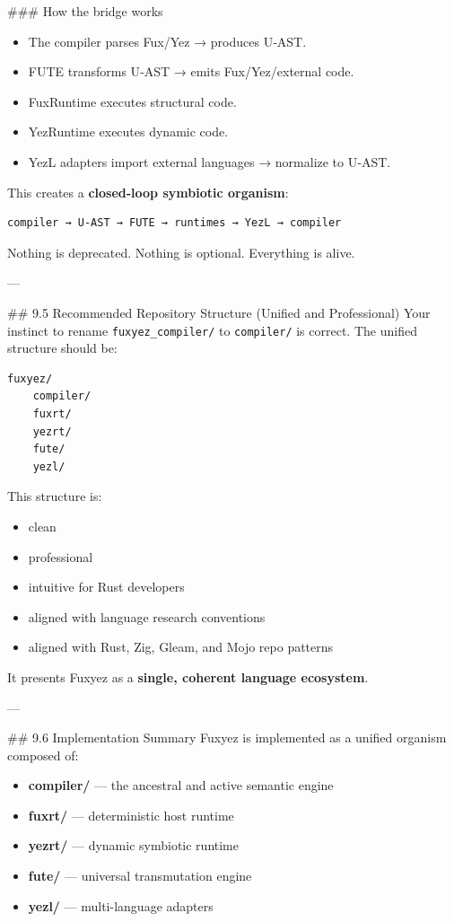 \documentclass[12pt, a4paper]{book}
\begin{document}
\#\#\# How the bridge works  
\begin{itemize}
  \item The compiler parses Fux/Yez → produces U‑AST.  
  \item FUTE transforms U‑AST → emits Fux/Yez/external code.  
  \item FuxRuntime executes structural code.  
  \item YezRuntime executes dynamic code.  
  \item YezL adapters import external languages → normalize to U‑AST.  
\end{itemize}

This creates a \textbf{closed-loop symbiotic organism}:

\begin{lstlisting}[language=fuxyez]
compiler → U-AST → FUTE → runtimes → YezL → compiler

\end{lstlisting}

Nothing is deprecated.  
Nothing is optional.  
Everything is alive.

---

\#\# 9.5 Recommended Repository Structure (Unified and Professional)  
Your instinct to rename \texttt{fuxyez\_compiler/} to \texttt{compiler/} is correct.  
The unified structure should be:

\begin{lstlisting}[language=fuxyez]
fuxyez/
    compiler/
    fuxrt/
    yezrt/
    fute/
    yezl/

\end{lstlisting}

This structure is:

\begin{itemize}
  \item clean  
  \item professional  
  \item intuitive for Rust developers  
  \item aligned with language research conventions  
  \item aligned with Rust, Zig, Gleam, and Mojo repo patterns  
\end{itemize}

It presents Fuxyez as a \textbf{single, coherent language ecosystem}.

---

\#\# 9.6 Implementation Summary  
Fuxyez is implemented as a unified organism composed of:

\begin{itemize}
  \item \textbf{compiler/} — the ancestral and active semantic engine  
  \item \textbf{fuxrt/} — deterministic host runtime  
  \item \textbf{yezrt/} — dynamic symbiotic runtime  
  \item \textbf{fute/} — universal transmutation engine  
  \item \textbf{yezl/} — multi-language adapters  
\end{itemize}
\end{document}
